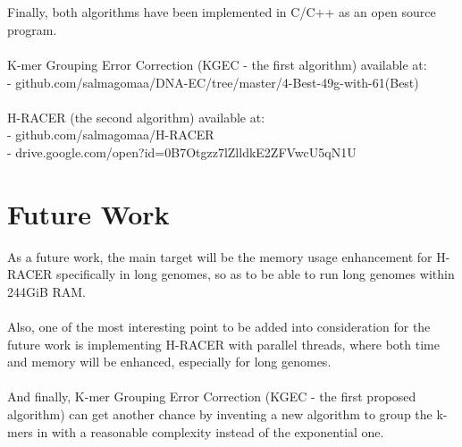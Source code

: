 \documentclass[12pt,openany]{llncs}
\begin{document}
\\
\\
Finally, both algorithms have been implemented in C/C++ as an open source program.
\\
\\
K-mer Grouping Error Correction (KGEC - the first algorithm) available at: 
\\
- github.com/salmagomaa/DNA-EC/tree/master/4-Best-49g-with-61(Best)
\\
\\
H-RACER (the second algorithm) available at: 
\\
- github.com/salmagomaa/H-RACER
\\
- drive.google.com/open?id=0B7Otgzz7lZlldkE2ZFVwcU5qN1U


\section{Future Work}
As a future work, the main target will be the memory usage enhancement for H-RACER specifically in long genomes, so as to be able to run long genomes within 244GiB RAM.
\\
\\
Also, one of the most interesting point to be added into consideration for the future work is implementing H-RACER with parallel threads, where both time and memory will be enhanced, especially for long genomes.
\\
\\
And finally, K-mer Grouping Error Correction (KGEC - the first proposed algorithm) can get another chance by inventing a new algorithm to group the k-mers in with a reasonable complexity instead of the exponential one.

\newpage
{}
\backmatter
 
\end{document}
